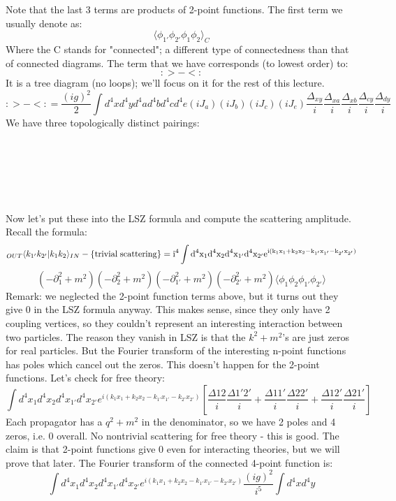 \documentclass[12 pt]{article}
\begin{document}
Note that the last 3 terms are products of 2-point functions. The first term we usually denote as:
\[  \langle \phi_{1'} \phi_{2'} \phi_1 \phi_2 \rangle _C   \]
Where the C stands for "connected"; a different type of connectedness than that of connected diagrams. The term that we have corresponds (to lowest order) to:
\[   :>-<: \]
It is a tree diagram (no loops); we'll focus on it for the rest of this lecture.
\[  :>-<: = \frac{(ig)^2}{2} \int d^4 x d^4 y d^4 a d^4 b d^4 c d^4 e (iJ_a) (iJ_b) (iJ_c) (iJ_e) \frac{\Delta_{xy}}{i} \frac{\Delta_{xa}}{i} \frac{\Delta_{xb}}{i} \frac{\Delta_{cy}}{i} \frac{\Delta_{dy}}{i} \]
We have three topologically distinct pairings:
\\
\\
\\
\\
\\
\\
\\
Now let's put these into the LSZ formula and compute the scattering amplitude. Recall the formula:
\[   _{OUT}\langle k_{1'} k_{2'} | k_1 k_2 \rangle_{IN} -  \{\rm{trivial\;scattering}\} =  i^4 \int d^4x_1 d^4 x_2 d^4 x_{1'} d^4 x_{2'} e^{i(k_1x_1 + k_2x_2 - k_{1'}x_{1'} - k_{2'}x_{2'})}\]
\[   (-\partial_1^2 +m^2) (-\partial_2^2 +m^2) (-\partial_{1'}^2 +m^2) (-\partial_{2'}^2 +m^2) \langle \phi_1 \phi_2 \phi_{1'} \phi_{2'} \rangle \]
Remark: we neglected the 2-point function terms above, but it turns out they give 0 in the LSZ formula anyway. This makes sense, since they only have 2 coupling vertices, so they couldn't represent an interesting interaction between two particles. The reason they vanish in LSZ is that the $k^2+m^2$'s are just zeros for real particles. But the Fourier transform of the interesting n-point functions has poles which cancel out the zeros. This doesn't happen for the 2-point functions. Let's check for free theory:
\[   \int d^4x_1 d^4 x_2 d^4 x_{1'} d^4 x_{2'} e^{i(k_1x_1 + k_2x_2 - k_{1'}x_{1'} - k_{2'}x_{2'})} \left[  \frac{\Delta{12}}{i}\frac{\Delta{1'2'}}{i} + \frac{\Delta{11'}}{i}\frac{\Delta{22'}}{i} + \frac{\Delta{12'}}{i}\frac{\Delta{21'}}{i} \right]   \]
Each propagator has a $q^2+m^2$ in the denominator, so we have 2 poles and 4 zeros, i.e. 0 overall. No nontrivial scattering for free theory - this is good. The claim is that 2-point functions give 0 even for interacting theories, but we will prove that later. The Fourier transform of the connected 4-point function is:
\[    \int d^4x_1 d^4 x_2 d^4 x_{1'} d^4 x_{2'} e^{i(k_1x_1 + k_2x_2 - k_{1'}x_{1'} - k_{2'}x_{2'})} \frac{(ig)^2}{i^5} \int d^4x d^4 y  \]
\end{document}
